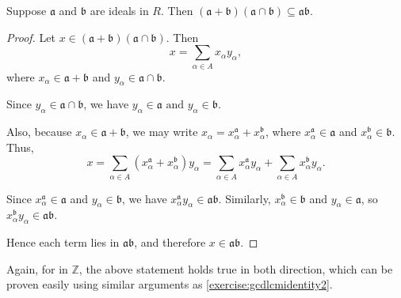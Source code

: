 \begin{proposition}\label{proposition:aplusbtimesacapbinab}
    Suppose \(\mathfrak{a}\) and \(\mathfrak{b}\) are ideals in \(R\). Then  \((\mathfrak{a} + \mathfrak{b})  (\mathfrak{a} \cap \mathfrak{b}) \subseteq \mathfrak{a} \mathfrak{b}\).
\end{proposition}
\begin{proof}
    Let $x \in (\mathfrak{a} + \mathfrak{b})(\mathfrak{a} \cap \mathfrak{b})$. Then
\[
x = \sum_{\alpha \in A} x_\alpha y_\alpha,
\]
where $x_\alpha \in \mathfrak{a} + \mathfrak{b}$ and 
$y_\alpha \in \mathfrak{a} \cap \mathfrak{b}$.

Since $y_\alpha \in \mathfrak{a} \cap \mathfrak{b}$, we have \(y_\alpha \in \mathfrak{a} \text{ and } y_\alpha \in \mathfrak{b}.\)

Also, because $x_\alpha \in \mathfrak{a} + \mathfrak{b}$, we may write \(x_\alpha = x_\alpha^{\mathfrak{a}} + x_\alpha^{\mathfrak{b}}\), where $x_\alpha^{\mathfrak{a}} \in \mathfrak{a}$ and
$x_\alpha^{\mathfrak{b}} \in \mathfrak{b}$. Thus,
\[
x
= \sum_{\alpha \in A}
(x_\alpha^{\mathfrak{a}} + x_\alpha^{\mathfrak{b}}) y_\alpha
= \sum_{\alpha \in A} x_\alpha^{\mathfrak{a}} y_\alpha
+ \sum_{\alpha \in A} x_\alpha^{\mathfrak{b}} y_\alpha.
\]

Since $x_\alpha^{\mathfrak{a}} \in \mathfrak{a}$ and $y_\alpha \in \mathfrak{b}$,
we have $x_\alpha^{\mathfrak{a}} y_\alpha \in \mathfrak{a}\mathfrak{b}$.
Similarly, $x_\alpha^{\mathfrak{b}} \in \mathfrak{b}$ and $y_\alpha \in \mathfrak{a}$,
so $x_\alpha^{\mathfrak{b}} y_\alpha \in \mathfrak{a}\mathfrak{b}$.

Hence each term lies in $\mathfrak{a}\mathfrak{b}$, and therefore \(x \in \mathfrak{a}\mathfrak{b}.\)
\end{proof}

Again, for in \(\mathbb{Z}\), the above statement holds true in both direction, which can be proven easily using similar arguments as \autoref{exercise:gcdlcmidentity2}.

